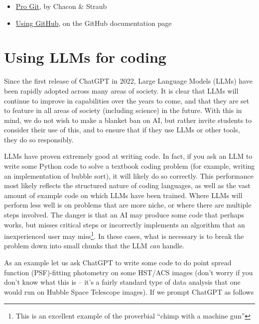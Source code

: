 \documentclass{tufte-book}
\begin{document}


\begin{itemize}
    \item \href{https://git-scm.com/book/en/v2}{Pro Git}, by Chacon \& Straub
    \item \href{https://docs.github.com/en/get-started/start-your-journey/git-and-github-learning-resources}{Using GitHub}, on the GitHub documentation page
\end{itemize}

\section{Using LLMs for coding}

Since the first release of ChatGPT in 2022, Large Language Models (LLMs) have been rapidly adopted across many areas of society. It is clear that LLMs will continue to improve in capabilities over the years to come, and that they are set to feature in all areas of society (including science) in the future. With this in mind, we do not wish to make a blanket ban on AI, but rather invite students to consider their use of this, and to ensure that if they use LLMs or other tools, they do so responsibly.

LLMs have proven extremely good at writing code. In fact, if you ask an LLM to write some Python code to solve a textbook coding problem (for example, writing an implementation of bubble sort), it will likely do so correctly. This performance most likely reflects the structured nature of coding languages, as well as the vast amount of example code on which LLMs have been trained. Where LLMs will perform less well is on problems that are more niche, or where there are multiple steps involved. The danger is that an AI may produce some code that perhaps works, but misses critical steps or incorrectly implements an algorithm that an inexperienced user may miss\footnote{This is an excellent example of the proverbial ``chimp with a machine gun''}. In these cases, what is necessary is to break the problem down into small chunks that the LLM {\it can} handle.

As an example let us ask ChatGPT to write some code to do point spread function (PSF)-fitting photometry on some HST/ACS images (don't worry if you don't know what this is -- it's a fairly standard type of data analysis that one would run on Hubble Space Telescope images). If we prompt ChatGPT as follows
\end{document}

